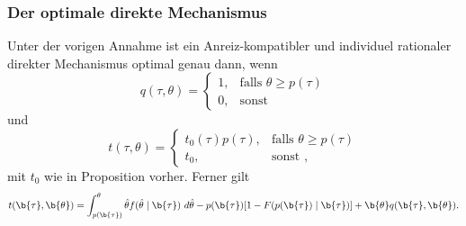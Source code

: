 \begin{frame}
  \frametitle{Der optimale direkte Mechanismus}
  \justifying
  \begin{thmS}
    Unter der vorigen Annahme ist ein Anreiz-kompatibler und individuel rationaler direkter Mechanismus optimal genau dann, wenn
    \begin{equation*}
      q(\tau, \theta) = \left\{\begin{array}{lr}
        1, & \text{falls } \theta \ge p(\tau) \\
        0, & \text{sonst }
        \end{array}
    \end{equation*}
    und
    \begin{equation*}
      t(\tau, \theta) = \left\{\begin{array}{lr}
        t_{0}(\tau) p(\tau), & \text{falls } \theta \ge p(\tau) \\
        t_{0}, & \text{sonst },
        \end{array}
    \end{equation*}
    mit $t_{0}$ wie in Proposition vorher. Ferner gilt
    \begin{equation*}
      t(\b{\tau}, \b{\theta}) = \int_{p(\b{\tau})}^{\theta}\hat{\theta} f(\hat{\theta} \mid \b{\tau}) \ d \hat{\theta} - p(\b{\tau}) [1 - F(p(\b{\tau}) \mid \b{\tau})] + \b{\theta} q(\b{\tau}, \b{\theta}).
    \end{equation*}
  \end{thmS}
\end{frame}

\bgroup
{}
\begin{frame}[plain]{}
\end{frame}
\egroup
